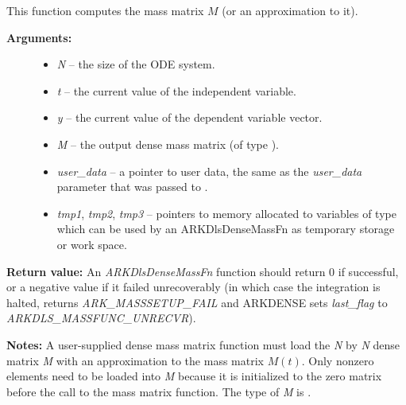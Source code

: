 \documentclass[letterpaper,10pt,english]{sphinxmanual}
\begin{document}
\begin{fulllineitems}
\label{c_interface/User_supplied:ARKDlsDenseMassFn}
This function computes the mass matrix $M$ (or an approximation to it).
\begin{description}
\item[{\textbf{Arguments:}}] \leavevmode\begin{itemize}
\item {} 
\emph{N} -- the size of the ODE system.

\item {} 
\emph{t} -- the current value of the independent variable.

\item {} 
\emph{y} -- the current value of the dependent variable vector.

\item {} 
\emph{M} -- the output dense mass matrix (of type ).

\item {} 
\emph{user\_data} -- a pointer to user data, the same as the
\emph{user\_data} parameter that was passed to {\hyperref[c_interface/User_callable:ARKodeSetUserData]{}}.

\item {} 
\emph{tmp1}, \emph{tmp2}, \emph{tmp3} -- pointers to memory allocated to
variables of type  which can be used by an
ARKDlsDenseMassFn as temporary storage or work space.

\end{itemize}

\end{description}

\textbf{Return value:}
An \emph{ARKDlsDenseMassFn} function should return 0 if
successful, or a negative value if it failed unrecoverably (in
which case the integration is halted, {\hyperref[c_interface/User_callable:ARKode]{}} returns
\emph{ARK\_MASSSETUP\_FAIL} and ARKDENSE sets \emph{last\_flag} to
\emph{ARKDLS\_MASSFUNC\_UNRECVR}).

\textbf{Notes:} A user-supplied dense mass matrix function must load the
\emph{N} by \emph{N} dense matrix \emph{M} with an approximation to the mass matrix
$M(t)$. Only nonzero elements need to be loaded into \emph{M}
because it is initialized to the zero matrix before the call
to the mass matrix function. The type of \emph{M} is .


\end{fulllineitems}
\end{document}
